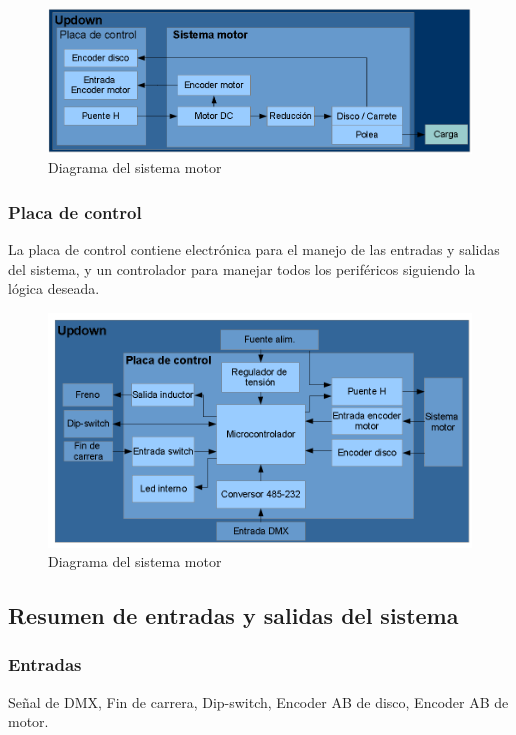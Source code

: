 \begin{figure}[!ht]
	\centering
	\includegraphics[width=15cm,scale=1]{resources/1_11-diagramaSistemaMotor.png}
	\caption{Diagrama del sistema motor}
	\label{fig:\thefigure}
\end{figure}

\subsubsection{Placa de control}
La placa de control contiene electrónica para el manejo de las entradas y salidas del sistema, y un controlador para manejar todos los periféricos siguiendo la lógica deseada.\\

\begin{figure}[!ht]
	\centering
	\includegraphics[width=15cm,scale=1]{resources/1_12-diagramaPlacaControl.png}
	\caption{Diagrama del sistema motor}
	\label{fig:\thefigure}
\end{figure}


\subsection{Resumen de entradas y salidas del sistema}
\subsubsection{Entradas} 
Señal de DMX, Fin de carrera, Dip-switch, Encoder AB de disco, Encoder AB de motor.\\
